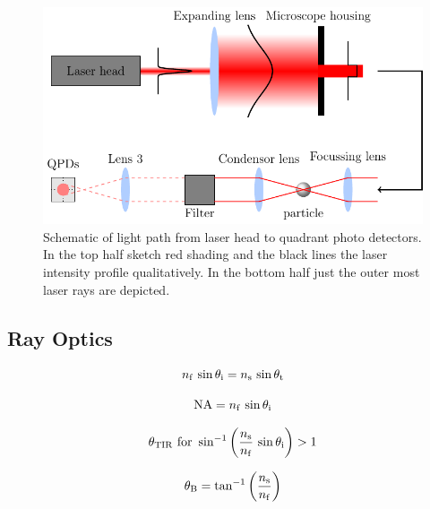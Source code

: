 \begin{figure}[htp]
  \centering
  \includegraphics[]{Plots/cache/setup.pdf}
  \caption{Schematic of light path from laser head to quadrant photo detectors. 
  In the top half sketch red shading and the black lines the laser intensity 
profile qualitatively. In the bottom half just the outer most laser rays are 
depicted.}
  \label{fig:Th-setup}
\end{figure}

\subsection{Ray Optics\label{sec:Th-rayoptics}}

\cite[Chapter 7]{Jackson2013}

\begin{equation}
  n_{\mathrm{f}}\,\sin\theta_{\mathrm{i}} = n_{\mathrm{s}}\,\sin\theta_{\mathrm{t}}
  \label{eq:Th-Snell}
\end{equation}

\begin{equation}
  \text{NA} = n_{\mathrm{f}}\,\sin\theta_{\mathrm{i}}
  \label{eq:Th-NA}
\end{equation}

\begin{equation}
  \theta_{\mathrm{TIR}} \text{~for~} \sin^{-1}\left( \frac{n_{\mathrm{s}}}{n_{\mathrm{f}}}\,\sin\theta_{\mathrm{i}} 
  \right) > 1
  \label{eq:Th-TIR}
\end{equation}

\begin{equation}
  \theta_{\mathrm{B}} = \tan^{-1}\left( \frac{n_{\mathrm{s}}}{n_{\mathrm{f}}} \right)
  \label{eq:Th-brewster}
\end{equation}

\lipsum[1-2]

